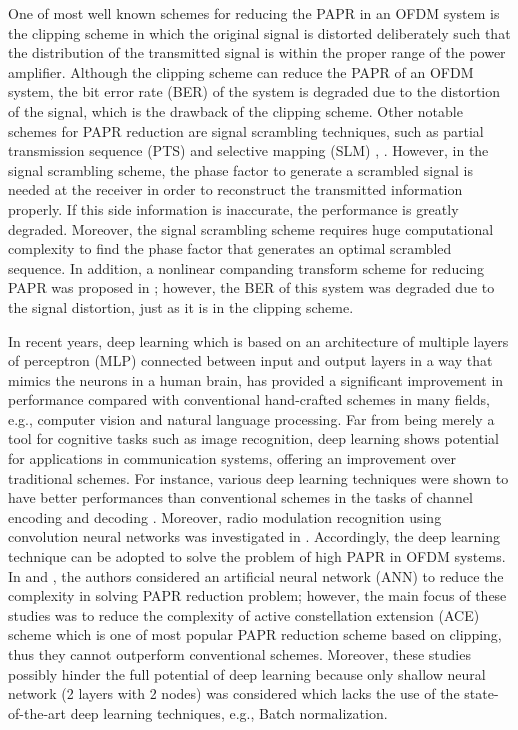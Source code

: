 \documentclass[journal]{IEEEtran}
\begin{document}
One of most well known schemes for reducing the PAPR in an OFDM system is the clipping scheme \cite{b1} in which the original signal is distorted deliberately such that the distribution of the transmitted signal is within the proper range of the power amplifier. Although the clipping scheme can reduce the PAPR of an OFDM system, the bit error rate (BER) of the system is degraded due to the distortion of the signal, which is the drawback of the clipping scheme. Other notable schemes for PAPR reduction are signal scrambling techniques, such as partial transmission sequence (PTS) and selective mapping (SLM) \cite{b2}, \cite{b3}. However, in the signal scrambling scheme, the phase factor to generate a scrambled signal is needed at the receiver in order to reconstruct the transmitted information properly. If this side information is inaccurate, the performance is greatly degraded. Moreover, the signal scrambling scheme requires huge computational complexity to find the phase factor that generates an optimal scrambled sequence. In addition, a nonlinear companding transform scheme for reducing PAPR was proposed in \cite{b4}; however, the BER of this system was degraded due to the signal distortion, just as it is in the clipping scheme.

In recent years, deep learning which is based on an architecture of multiple layers of perceptron (MLP) connected between input and output layers in a way that mimics the neurons in a human brain, has provided a significant improvement in performance compared with conventional hand-crafted schemes in many fields, e.g., computer vision and natural language processing. Far from being merely a tool for cognitive tasks such as image recognition, deep learning shows potential for applications in communication systems, offering an improvement over traditional schemes. For instance, various deep learning techniques were shown to have better performances than conventional schemes in the tasks of channel encoding and decoding \cite{b5}. Moreover, radio modulation recognition using convolution neural networks was investigated in \cite{b6}. Accordingly, the deep learning technique can be adopted to solve the problem of high PAPR in OFDM systems. In \cite{b7} and \cite{b8}, the authors considered an artificial neural network (ANN) to reduce the complexity in solving PAPR reduction problem; however, the main focus of these studies was to reduce the complexity of active constellation extension (ACE) scheme which is one of most popular PAPR reduction scheme based on clipping, thus they cannot outperform conventional schemes. Moreover, these studies possibly hinder the full potential of deep learning because only shallow neural network (2 layers with 2 nodes) was considered which lacks the use of the state-of-the-art deep learning techniques, e.g., Batch normalization.
\end{document}
